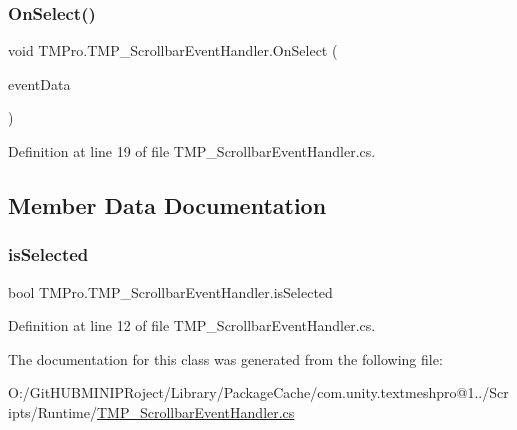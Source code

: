 \mbox{\label{class_t_m_pro_1_1_t_m_p___scrollbar_event_handler_a92c7d93261888c79e1605b7944238e8d}} 
\subsubsection{\texorpdfstring{OnSelect()}{OnSelect()}}
{\footnotesize\ttfamily void T\+M\+Pro.\+T\+M\+P\+\_\+\+Scrollbar\+Event\+Handler.\+On\+Select (\begin{DoxyParamCaption}\item[{Base\+Event\+Data}]{event\+Data }\end{DoxyParamCaption})}



Definition at line 19 of file T\+M\+P\+\_\+\+Scrollbar\+Event\+Handler.\+cs.



\subsection{Member Data Documentation}
\mbox{\label{class_t_m_pro_1_1_t_m_p___scrollbar_event_handler_a32cdf09d2c7ad284a60debb41a35600d}} 
\subsubsection{\texorpdfstring{isSelected}{isSelected}}
{\footnotesize\ttfamily bool T\+M\+Pro.\+T\+M\+P\+\_\+\+Scrollbar\+Event\+Handler.\+is\+Selected}



Definition at line 12 of file T\+M\+P\+\_\+\+Scrollbar\+Event\+Handler.\+cs.



The documentation for this class was generated from the following file\+:\begin{DoxyCompactItemize}
\item 
O\+:/\+Git\+H\+U\+B\+M\+I\+N\+I\+P\+Roject/\+Library/\+Package\+Cache/com.\+unity.\+textmeshpro@1../\+Scripts/\+Runtime/\mbox{\hyperlink{_t_m_p___scrollbar_event_handler_8cs}{T\+M\+P\+\_\+\+Scrollbar\+Event\+Handler.\+cs}}\end{DoxyCompactItemize}
